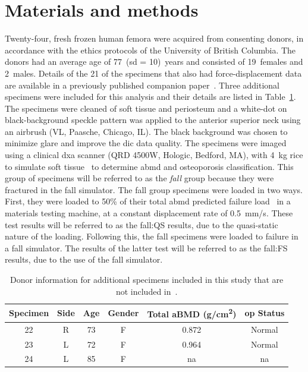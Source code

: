 \section{Materials and methods}
Twenty-four, fresh frozen human femora were acquired from consenting donors, in accordance with the ethics protocols of the University of British Columbia.
The donors had an average age of 77~(\ac{sd} = 10)~years and consisted of 19~females and 2~males.
Details of the 21 of the specimens that also had force-displacement data are available in a previously published companion paper~\cite{gilchrist_mechanics_2013}.
Three additional specimens were included for this analysis and their details are listed in Table~\ref{tab:additional_specimens}.
The specimens were cleaned of soft tissue and periosteum and a white-dot on black-background speckle pattern was applied to the anterior superior neck using an airbrush (VL, Paasche, Chicago, IL).
The black background was chosen to minimize glare and improve the \ac{dic} data quality.
The specimens were imaged using a clinical \ac{dxa} scanner (QRD 4500W, Hologic, Bedford, MA), with 4~\ac{kg} rice to simulate soft tissue~\cite{sran_accuracy_2004} to determine \ac{abmd} and osteoporosis classification.
This group of specimens will be referred to as the \textit{fall} group because they were fractured in the fall simulator.
The fall group specimens were loaded in two ways.
First, they were loaded to 50\% of their total \ac{abmd} predicted failure load~\cite{boehm_prediction_2008} in a materials testing machine, at a constant displacement rate of 0.5~\ac{mm}/\ac{s}.
These test results will be referred to as the fall:QS results, due to the quasi-static nature of the loading.
Following this, the fall specimens were loaded to failure in a fall simulator.
The results of the latter test will be referred to as the fall:FS results, due to the use of the fall simulator.

\begin{table}
\renewcommand{\arraystretch}{1.5}
\caption[Additional study specimens]{Donor information for additional specimens included in this study that are not included in~\citep{gilchrist_mechanics_2013}.}
\label{tab:additional_specimens}
\begin{tabular}{|c|c|c|c|c|c|}
\hline
Specimen & Side & Age & Gender & Total aBMD (g/cm\textsuperscript{2}) & \acs{op} Status \\
\hline
\hline
22 & R & 73 & F & 0.872 & Normal \\ \hline
23 & L & 72 & F & 0.964 & Normal \\ \hline
24 & L & 85 & F & \acs{na} & \acs{na} \\
\hline
\end{tabular}
\end{table}

